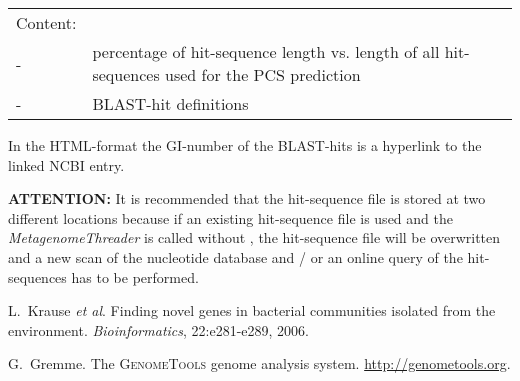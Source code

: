 \documentclass[12pt,titlepage]{article}
\newcommand{\MetagenomeThreader}{\textit{MetagenomeThreader}\xspace}
\newcommand{\Attention}{\textbf{ATTENTION:}\xspace}
\begin{document}
\begin{tabular}{p{}p{14cm}}
Content:
\\
- &percentage of hit-sequence length vs. length of all
hit-sequences used for the PCS prediction
\\
- &BLAST-hit definitions
\end{tabular}

In the HTML-format the GI-number of the BLAST-hits is a hyperlink to the
linked NCBI entry.

\Attention It is recommended that the hit-sequence file is stored at two
different locations because if an existing hit-sequence file is used and
the \MetagenomeThreader is called without  , the hit-sequence file
will be overwritten and a new scan of the nucleotide database and / or an online query of the
hit-sequences has to be performed.

%
%
\begin{thebibliography}{1}

L.~Krause \textit{et al}.
\newblock Finding novel genes in bacterial communities isolated
from the environment. \textit{Bioinformatics}, 22:e281-e289, 2006.

G.~Gremme.
\newblock The \textsc{GenomeTools} genome analysis system.
  \url{http://genometools.org}.

\end{thebibliography}
\end{document}
